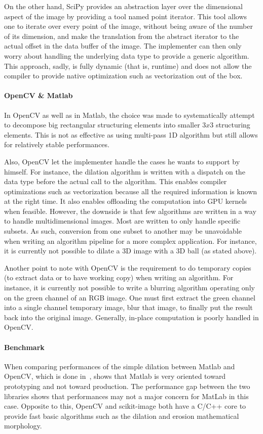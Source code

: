 On the other hand, SciPy provides an abstraction layer over the dimensional aspect of the image by providing a tool
named point iterator. This tool allows one to iterate over every point of the image, without being aware of the number
of its dimension, and make the translation from the abstract iterator to the actual offset in the data buffer of the
image. The implementer can then only worry about handling the underlying data type to provide a generic algorithm. This
approach, sadly, is fully dynamic (that is, runtime) and does not allow the compiler to provide native optimization such
as vectorization out of the box.

\paragraph{OpenCV \& Matlab} In OpenCV as well as in Matlab, the choice was made to systematically attempt to decompose
big rectangular structuring elements into smaller $3x3$ structuring elements. This is not as effective as using
multi-pass 1D algorithm but still allows for relatively stable performances.

Also, OpenCV let the implementer handle the cases he wants to support by himself. For instance, the dilation algorithm
is written with a dispatch on the data type before the actual call to the algorithm. This enables compiler optimizations
such as vectorization because all the required information is known at the right time. It also enables offloading the
computation into GPU kernels when feasible. However, the downside is that few algorithms are written in a way to handle
multidimensional images. Most are written to only handle specific subsets. As such, conversion from one subset to
another may be unavoidable when writing an algorithm pipeline for a more complex application. For instance, it is
currently not possible to dilate a 3D image with a 3D ball (as stated above).

Another point to note with OpenCV is the requirement to do temporary copies (to extract data or to have working copy)
when writing an algorithm. For instance, it is currently not possible to write a blurring algorithm operating only on
the green channel of an RGB image. One must first extract the green channel into a single channel temporary image, blur
that image, to finally put the result back into the original image. Generally, in-place computation is poorly handled in
OpenCV.

\paragraph{Benchmark} When comparing performances of the simple dilation between Matlab and OpenCV, which is done
in~\cite{matuska.2012.bench}, shows that Matlab is very oriented toward prototyping and not toward production. The
performance gap between the two libraries shows that performances may not a major concern for MatLab in this case.
Opposite to this, OpenCV and scikit-image both have a C/C++ core to provide fast basic algorithms such as the dilation
and erosion mathematical morphology.

